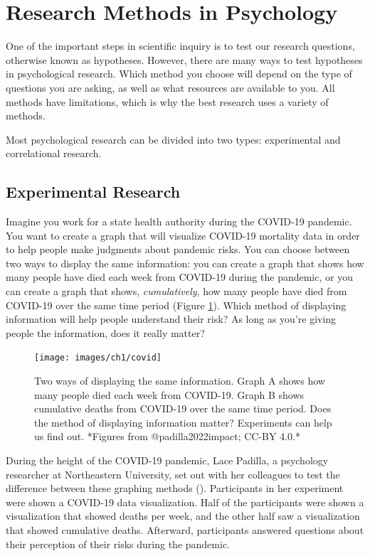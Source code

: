 \documentclass[
]{krantz}
\begin{document}
\section{Research Methods in Psychology}\label{research-methods-in-psychology}

One of the important steps in scientific inquiry is to test our research questions, otherwise known as hypotheses. However, there are many ways to test hypotheses in psychological research. Which method you choose will depend on the type of questions you are asking, as well as what resources are available to you. All methods have limitations, which is why the best research uses a variety of methods.

Most psychological research can be divided into two types: experimental and correlational research.

\subsection*{Experimental Research}\label{experimental-research}


Imagine you work for a state health authority during the COVID-19 pandemic. You want to create a graph that will visualize COVID-19 mortality data in order to help people make judgments about pandemic risks. You can choose between two ways to display the same information: you can create a graph that shows how many people have died each week from COVID-19 during the pandemic, or you can create a graph that shows, \emph{cumulatively}, how many people have died from COVID-19 over the same time period (Figure \ref{fig:covid}). Which method of displaying information will help people understand their risk? As long as you're giving people the information, does it really matter?

\begin{figure}

{\centering \texttt{[image: images/ch1/covid]} 

}

\caption{Two ways of displaying the same information. Graph A shows how many people died each week from COVID-19. Graph B shows cumulative deaths from COVID-19 over the same time period. Does the method of displaying information matter? Experiments can help us find out. *Figures from @padilla2022impact; CC-BY 4.0.*}\label{fig:covid}
\end{figure}

During the height of the COVID-19 pandemic, Lace Padilla, a psychology researcher at Northeastern University, set out with her colleagues to test the difference between these graphing methods (). Participants in her experiment were shown a COVID-19 data visualization. Half of the participants were shown a visualization that showed deaths per week, and the other half saw a visualization that showed cumulative deaths. Afterward, participants answered questions about their perception of their risks during the pandemic.
\end{document}
